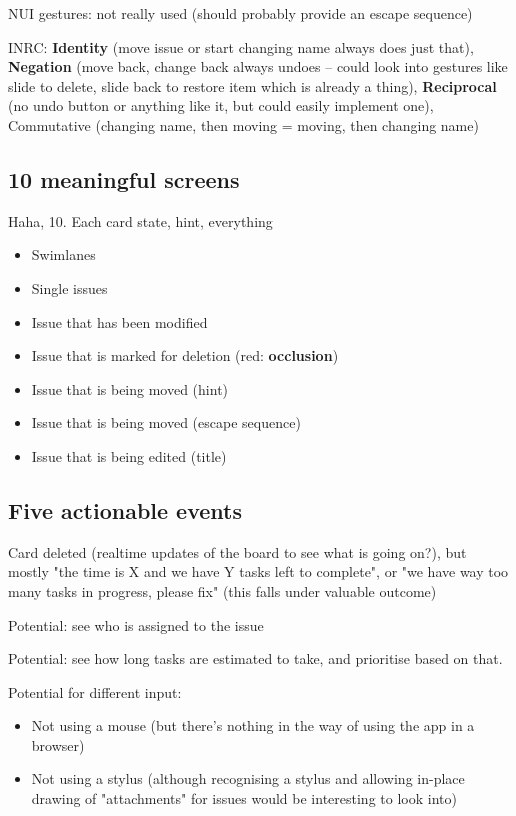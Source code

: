 NUI gestures: not really used (should probably provide an escape sequence)

INRC: \textbf{Identity} (move issue or start changing name always does just that), \textbf{Negation} (move back, change back always undoes – could look into gestures like slide to delete, slide back to restore item which is already a thing), \textbf{Reciprocal} (no undo button or anything like it, but could easily implement one), Commutative (changing name, then moving = moving, then changing name) %

\subsection{10 meaningful screens}

Haha, 10. Each card state, hint, everything


\begin{itemize}
  \item Swimlanes
  \item Single issues
  \item Issue that has been modified
  \item Issue that is marked for deletion (red: \textbf{occlusion}) 
  \item Issue that is being moved (hint)
  \item Issue that is being moved (escape sequence)
  \item Issue that is being edited (title)
\end{itemize}

\subsection{Five actionable events}

Card deleted (realtime updates of the board to see what is going on?), but mostly "the time is X and we have Y tasks left to complete", or "we have way too many tasks in progress, please fix" (this falls under valuable outcome)

Potential: see who is assigned to the issue

Potential: see how long tasks are estimated to take, and prioritise based on that.

Potential for different input:
\begin{itemize}
  \item Not using a mouse (but there's nothing in the way of using the app in a browser)
  \item Not using a stylus (although recognising a stylus and allowing in-place drawing of "attachments" for issues would be interesting to look into)
\end{itemize}

